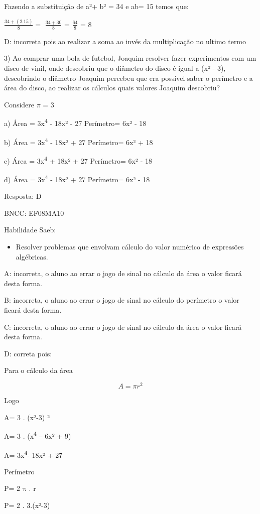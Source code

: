 Fazendo a substituição de a²+ b² = 34 e ab= 15 temos que:

\(\frac{34 + (2.15)}{8} =\) \(\frac{34 + 30}{8}\) = \(\frac{64}{8}\) = 8

D: incorreta pois ao realizar a soma ao invés da multiplicação no ultimo
termo

3) Ao comprar uma bola de futebol, Joaquim resolver fazer experimentos
com um disco de vinil, onde descobriu que o diâmetro do disco é igual a
(x² - 3), descobrindo o diâmetro Joaquim percebeu que era possível saber
o perímetro e a área do disco, ao realizar os cálculos quais valores
Joaquim descobriu?

Considere \(\pi\) = 3

a) Área = 3x\textsuperscript{4} - 18x² - 27 Perímetro= 6x² - 18

b) Área = 3x\textsuperscript{4} - 18x² + 27 Perímetro= 6x² + 18

c) Área = 3x\textsuperscript{4} + 18x² + 27 Perímetro= 6x² - 18

d) Área = 3x\textsuperscript{4} - 18x² + 27 Perímetro= 6x² - 18

Resposta: D

BNCC: EF08MA10

Habilidade Saeb:

\begin{itemize}
\tightlist
\item
  Resolver problemas que envolvam cálculo do valor numérico de
  expressões algébricas.
\end{itemize}

A: incorreta, o aluno ao errar o jogo de sinal no cálculo da área o
valor ficará desta forma.

B: incorreta, o aluno ao errar o jogo de sinal no cálculo do perímetro o
valor ficará desta forma.

C: incorreta, o aluno ao errar o jogo de sinal no cálculo da área o
valor ficará desta forma.

D: correta pois:

Para o cálculo da área

\[A = \pi r^{2}\]

Logo

A= 3 . (x²-3) ²

A= 3 . (x\textsuperscript{4} -- 6x² + 9)

A= 3x\textsuperscript{4}- 18x² + 27

Perímetro

P= 2\(\text{\ π\ .\ r}\)

P= 2 . 3.(x²-3)

